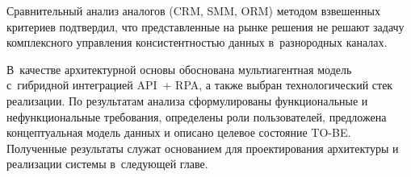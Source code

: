 Сравнительный анализ аналогов (CRM, SMM, ORM) методом взвешенных критериев подтвердил, что представленные на рынке решения не решают задачу комплексного управления консистентностью данных в~разнородных каналах.

В~качестве архитектурной основы обоснована мультиагентная модель с~гибридной интеграцией API~+ RPA, а также выбран технологический стек реализации. По результатам анализа сформулированы функциональные и нефункциональные требования, определены роли пользователей, предложена концептуальная модель данных и описано целевое состояние TO-BE. Полученные результаты служат основанием для проектирования архитектуры и реализации системы в~следующей главе.
